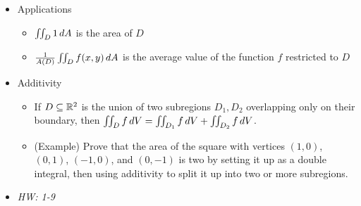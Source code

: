 \documentclass[11pt]{article}
\begin{document}
\begin{itemize}
\begin{itemize}
    \end{itemize}
  \item Applications
    \begin{itemize}
      \item \(\iint_D 1\,d A\) is the area of \(D\)
      \item \(\frac{1}{A(D)}\iint_D f(x,y)\,d A\) is the average value
            of the function \(f\) restricted to \(D\)
    \end{itemize}
  \item Additivity
    \begin{itemize}
      \item
        If \(D\subseteq\mathbb R^2\) is the union of two subregions
        \(D_1,D_2\) overlapping only on their boundary, then
        \(\iint_D f\,d V=\iint_{D_1}f\,d V+\iint_{D_2}f\,d V\).
      \item
        (Example) Prove that the area of the square with vertices
        \((1,0)\), \((0,1)\), \((-1,0)\), and \((0,-1)\) is two
        by setting it up as a double integral, then using additivity
        to split it up into two or more subregions.
    \end{itemize}
  \item\textit{
    HW: 1-9
  }
\end{itemize}
\end{document}
